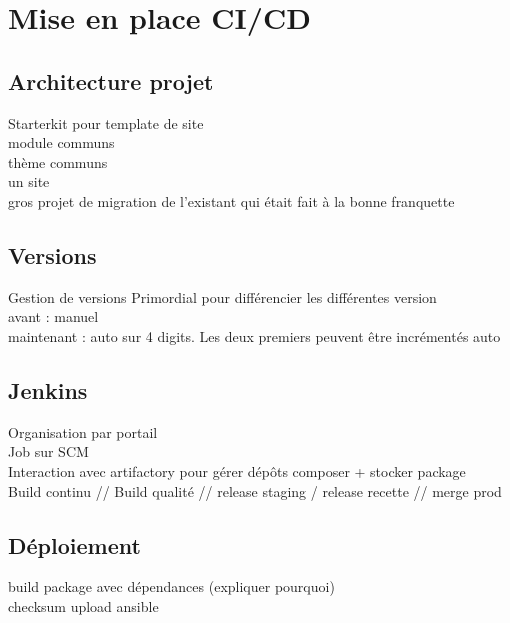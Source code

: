 \section{Mise en place CI/CD}
\subsection[Architecture]{Architecture projet}
\begin{frame}{\subsecname}
	Starterkit pour template de site
	 \\
	 module communs
	 \\
	 thème communs
	 \\
	 un site 
	 \\ gros projet de migration de l'existant qui était fait à la bonne franquette
\end{frame}

\subsection{Versions}
\begin{frame}{Gestion de versions}
	Primordial pour différencier les différentes version \\
	avant : manuel \\
	maintenant : auto sur 4 digits. Les deux premiers peuvent être incrémentés auto
\end{frame}

\subsection{Jenkins}
\begin{frame}{\subsecname}
	Organisation par portail \\ 
	Job sur SCM \\
	Interaction avec artifactory pour gérer dépôts composer + stocker package \\
	Build continu // Build qualité // release staging / release recette // merge prod
\end{frame}

\subsection{Déploiement}
\begin{frame}{\subsecname}
	build package avec dépendances (expliquer pourquoi)\\
	checksum
	upload
	ansible
\end{frame}

